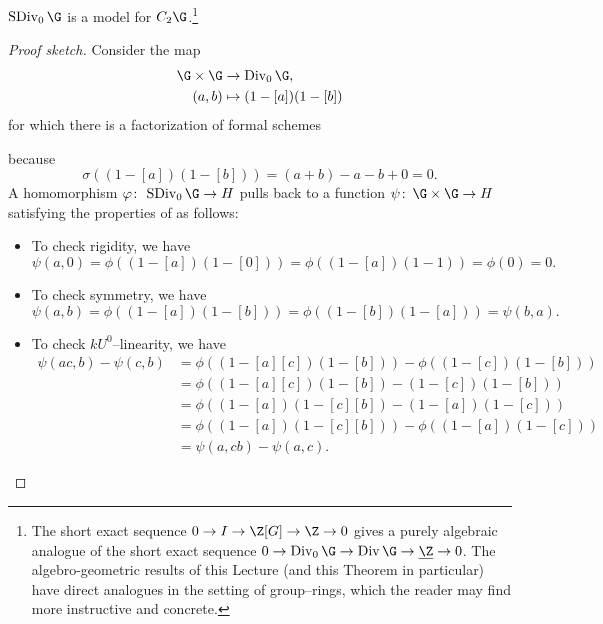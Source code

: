 \begin{theorem}\label{SDivModelsC2}
\(\SDiv_0 \G\) is a model for \(C_2 \G\).\footnote{The short exact sequence \(0 \to I \to \Z[G] \to \Z \to 0\) gives a purely algebraic analogue of the short exact sequence \(0 \to \Div_0 \G \to \Div \G \to \underline{\Z} \to 0\).  The algebro-geometric results of this Lecture (and this Theorem in particular) have direct analogues in the setting of group--rings, which the reader may find more instructive and concrete.}
\end{theorem}
\begin{proof}[Proof sketch]
Consider the map
\begin{align*}
\G \times \G & \to \Div_0 \G, \\
(a, b) & \mapsto (1 - [a])(1 - [b])
\end{align*}
for which there is a factorization of formal schemes
\begin{center}
\end{center}
because \[\sigma((1 - [a])(1 - [b])) = (a + b) - a - b + 0 = 0.\]  A homomorphism \(\phi\co \SDiv_0 \G \to H\) pulls back to a function \(\psi\co \G \times \G \to H\) satisfying the properties of  as follows:
\begin{itemize}
    \item To check rigidity, we have \[\psi(a, 0) = \phi((1 - [a])(1 - [0])) = \phi((1 - [a])(1 - 1)) = \phi(0) = 0.\]
    \item To check symmetry, we have \[\psi(a, b) = \phi((1 - [a])(1 - [b])) = \phi((1 - [b])(1 - [a])) = \psi(b, a).\]
    \item To check \(kU^0\)--linearity, we have
    \begin{align*}
    \psi(ac, b) - \psi(c, b) & = \phi((1 - [a][c])(1 - [b])) - \phi((1 - [c])(1 - [b])) \\
    & = \phi((1 - [a][c])(1 - [b]) - (1 - [c])(1 - [b])) \\
    & = \phi((1 - [a])(1 - [c][b]) - (1 - [a])(1 - [c])) \\
    & = \phi((1 - [a])(1 - [c][b])) - \phi((1 - [a])(1 - [c])) \\
    & = \psi(a, cb) - \psi(a, c).
    \end{align*}
\end{itemize}


\end{proof}
